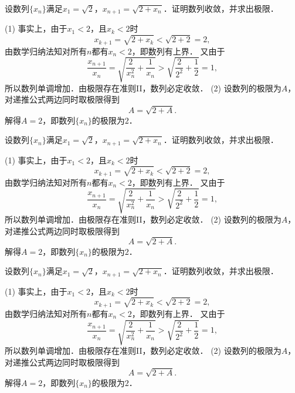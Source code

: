 \documentclass{njustexam}
\begin{document}
\bigskip

\begin{problem}
设数列$\{x_n\}$满足$x_1=\sqrt2$，$x_{n+1}=\sqrt{2+x_n}$．证明数列收敛，并求出极限．
\end{problem}

\smallskip

\begin{solution}
(1) 事实上，由于$x_1<2$，且$x_k<2$时
$$x_{k+1}=\sqrt{2+x_k}<\sqrt{2+2}=2,$$
由数学归纳法知对所有$n$都有$x_n<2$，即数列有上界．
又由于
$$\frac{x_{n+1}}{x_n}=\sqrt{\frac{2}{x_n^2}+\frac{1}{x_n}}>\sqrt{\frac{2}{2^2}+\frac{1}{2}}=1,$$
所以数列单调增加．由极限存在准则II，数列必定收敛．
(2) 设数列的极限为$A$，对递推公式两边同时取极限得到
$$A=\sqrt{2+A}.$$
解得$A=2$，即数列$\{x_n\}$的极限为$2$．
\end{solution}

\bigskip

\begin{problem}
设数列$\{x_n\}$满足$x_1=\sqrt2$，$x_{n+1}=\sqrt{2+x_n}$．证明数列收敛，并求出极限．
\end{problem}

\smallskip

\begin{solution}
(1) 事实上，由于$x_1<2$，且$x_k<2$时
$$x_{k+1}=\sqrt{2+x_k}<\sqrt{2+2}=2,$$
由数学归纳法知对所有$n$都有$x_n<2$，即数列有上界．
又由于
$$\frac{x_{n+1}}{x_n}=\sqrt{\frac{2}{x_n^2}+\frac{1}{x_n}}>\sqrt{\frac{2}{2^2}+\frac{1}{2}}=1,$$
所以数列单调增加．由极限存在准则II，数列必定收敛．
(2) 设数列的极限为$A$，对递推公式两边同时取极限得到
$$A=\sqrt{2+A}.$$
解得$A=2$，即数列$\{x_n\}$的极限为$2$．
\end{solution}

\bigskip

\begin{problem}
设数列$\{x_n\}$满足$x_1=\sqrt2$，$x_{n+1}=\sqrt{2+x_n}$．证明数列收敛，并求出极限．
\end{problem}

\smallskip

\begin{solution}
(1) 事实上，由于$x_1<2$，且$x_k<2$时
$$x_{k+1}=\sqrt{2+x_k}<\sqrt{2+2}=2,$$
由数学归纳法知对所有$n$都有$x_n<2$，即数列有上界．
又由于
$$\frac{x_{n+1}}{x_n}=\sqrt{\frac{2}{x_n^2}+\frac{1}{x_n}}>\sqrt{\frac{2}{2^2}+\frac{1}{2}}=1,$$
所以数列单调增加．由极限存在准则II，数列必定收敛．
(2) 设数列的极限为$A$，对递推公式两边同时取极限得到
$$A=\sqrt{2+A}.$$
解得$A=2$，即数列$\{x_n\}$的极限为$2$．
\end{solution}
\end{document}
